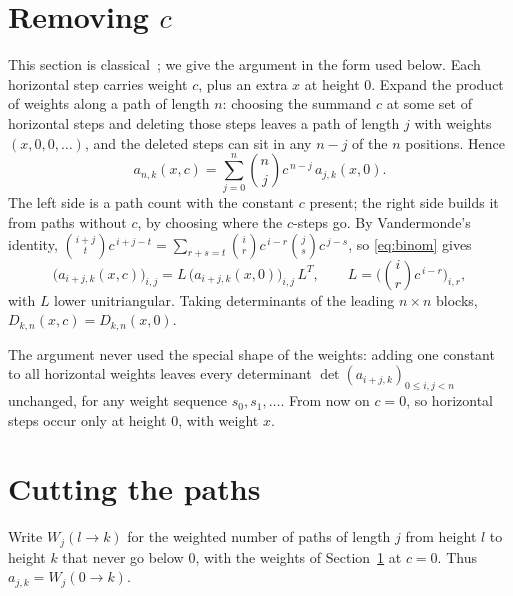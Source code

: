 \documentclass[11pt]{amsart}
\theoremstyle{definition}
\begin{document}
\section{Removing \texorpdfstring{$c$}{c}}\label{sec:step1}

This section is classical~\cite{L01,SS06}; we give the argument in the form used below.
Each horizontal step carries weight $c$, plus an extra $x$ at height $0$. Expand the product of weights along a path
of length $n$: choosing the summand $c$ at some set of horizontal steps and deleting those steps leaves a path of
length $j$ with weights $(x,0,0,\dots)$, and the deleted steps can sit in any $n-j$ of the $n$ positions. Hence
\begin{equation}\label{eq:binom}
a_{n,k}(x,c)=\sum_{j=0}^{n}\binom nj c^{\,n-j}\,a_{j,k}(x,0).
\end{equation}
The left side is a path count with the constant $c$ present; the right side builds it from paths without $c$, by
choosing where the $c$-steps go. By Vandermonde's identity,
$\binom{i+j}{t}c^{\,i+j-t}=\sum_{r+s=t}\binom ir c^{\,i-r}\binom js c^{\,j-s}$, so \eqref{eq:binom} gives
\[
\big(a_{i+j,k}(x,c)\big)_{i,j}=L\,\big(a_{i+j,k}(x,0)\big)_{i,j}\,L^{T},\qquad L=\Big(\binom ir c^{\,i-r}\Big)_{i,r},
\]
with $L$ lower unitriangular. Taking determinants of the leading $n\times n$ blocks, $D_{k,n}(x,c)=D_{k,n}(x,0)$.

The argument never used the special shape of the weights: adding one constant to all horizontal weights leaves every
determinant $\det(a_{i+j,k})_{0\le i,j<n}$ unchanged, for any weight sequence $s_0,s_1,\dots$. From now on $c=0$, so
horizontal steps occur only at height $0$, with weight $x$.

\section{Cutting the paths}\label{sec:step2}

Write $W_j(l\to k)$ for the weighted number of paths of length $j$ from height $l$ to height $k$ that never go below
$0$, with the weights of Section~\ref{sec:step1} at $c=0$. Thus $a_{j,k}=W_j(0\to k)$.
\end{document}

